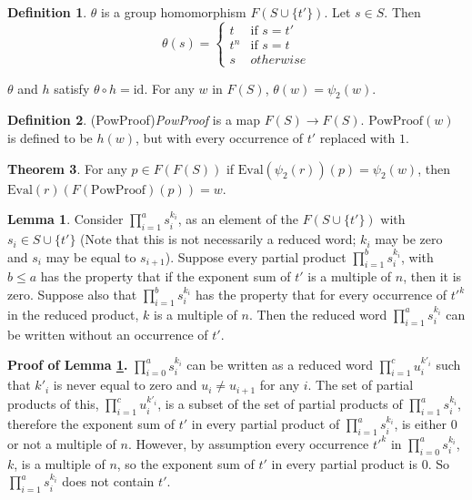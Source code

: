 \documentclass[12pt]{article} %
\theoremstyle{definition}
\newtheorem{theorem}{Theorem}[section]
\theoremstyle{definition}
\theoremstyle{definition}
\theoremstyle{definition}
\newtheorem{sublemma}{Lemma}[theorem]
\theoremstyle{definition}
\newtheorem{defn}[theorem]{Definition}
\theoremstyle{definition}
\begin{document}
\begin{defn}
  $\theta$ is a group homomorphism $F(S \cup \{t'\})$. Let $s \in S$. Then
  \begin{equation}
    \theta(s) = \begin{cases}
      t & \text{if } s = t' \\
      t^n & \text{if } s = t \\
      s & otherwise
    \end{cases}
  \end{equation}
\end{defn}

$\theta$ and $h$ satisfy $\theta \circ h = \text{id}$. For any $w$ in $F(S)$,
$\theta(w) = \psi_2(w)$.

\begin{defn}(PowProof)\label{PowProof}
  \textit{PowProof} is a map $F(S) \to F(S)$. $\text{PowProof}(w)$ is defined to be
  $h(w)$, but with every occurrence of $t'$ replaced with $1$.
\end{defn}

\begin{theorem}\label{powproof}
  For any $p \in F(F(S))$ if \newline $\text{Eval}(\psi_2(r))(p) = \psi_2(w)$,
  then $\text{Eval}(r)(F(\text{PowProof})(p)) = w$.
\end{theorem}

\begin{sublemma}\label{powproof1}
  Consider $\prod_{i = 1}^a s_i^{k_i}$, as an element of the $F(S \cup \{t'\})$
  with $s_i \in S \cup \{t'\}$ (Note that this is not necessarily a reduced
  word; $k_i$ may be zero and $s_i$ may be equal to $s_{i+1}$).
  Suppose every partial product $\prod_{i=1}^b s_i^{k_i}$,
  with $b \le a$ has the property that if the exponent sum of $t'$ is a multiple
  of $n$, then it is zero. Suppose also that $\prod_{i = 1}^b s_i^{k_i}$ has the
  property that for every occurrence of $t'^k$ in the reduced product, $k$ is a multiple of
  $n$. Then the reduced word $\prod_{i = 1}^a s_i^{k_i}$
  can be written without an occurrence of $t'$.
\end{sublemma}

\textbf{Proof of Lemma \ref{powproof1}.} $\prod_{i=0}^a s_i^{k_i}$ can be written as a reduced
word $\prod_{i = 1}^{c} u_i^{k'_i}$ such that $k'_i$ is never equal to zero and
$u_i \ne u_{i+1}$ for any $i$. The set of partial products of this,
$\prod_{i = 1}^{c} u_i^{k'_i}$, is a subset of the set of partial products of
$\prod_{i=1}^a s_i^{k_i}$,
therefore the exponent sum of $t'$ in every partial product of $\prod_{i=1}^a s_i^{k_i}$, is
either $0$ or not a multiple of $n$. However, by assumption every occurrence $t'^k$ in
$\prod_{i=0}^a s_i^{k_i}$, $k$, is a multiple of $n$, so the exponent sum of $t'$ in every
partial product is $0$. So $\prod_{i=1}^a s_i^{k_i}$ does not contain $t'$.
\end{document}
